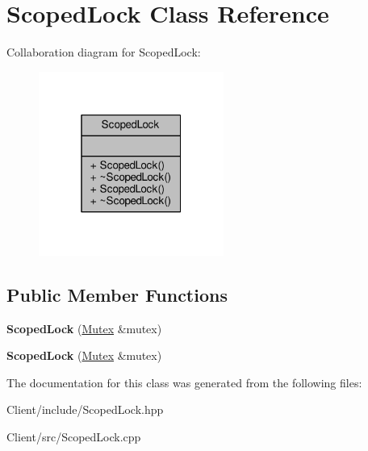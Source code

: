 \hypertarget{class_scoped_lock}{}\section{Scoped\+Lock Class Reference}
\label{class_scoped_lock}


Collaboration diagram for Scoped\+Lock\+:\nopagebreak
\begin{figure}[H]
\begin{center}
\leavevmode
\includegraphics[width=172pt]{da/deb/class_scoped_lock__coll__graph}
\end{center}
\end{figure}
\subsection*{Public Member Functions}
\begin{DoxyCompactItemize}
\item 
{\bfseries Scoped\+Lock} (\hyperlink{class_mutex}{Mutex} \&mutex)\hypertarget{class_scoped_lock_a61999a7c3114291e17f2aaddf53d7c54}{}\label{class_scoped_lock_a61999a7c3114291e17f2aaddf53d7c54}

\item 
{\bfseries Scoped\+Lock} (\hyperlink{class_mutex}{Mutex} \&mutex)\hypertarget{class_scoped_lock_a61999a7c3114291e17f2aaddf53d7c54}{}\label{class_scoped_lock_a61999a7c3114291e17f2aaddf53d7c54}

\end{DoxyCompactItemize}


The documentation for this class was generated from the following files\+:\begin{DoxyCompactItemize}
\item 
Client/include/Scoped\+Lock.\+hpp\item 
Client/src/Scoped\+Lock.\+cpp\end{DoxyCompactItemize}
